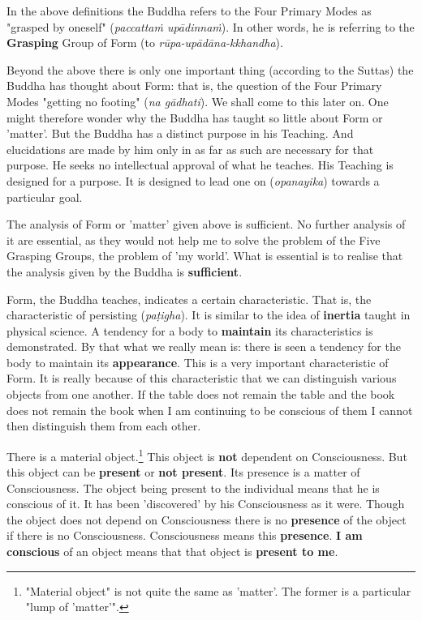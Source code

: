 In the above definitions the Buddha refers to the Four Primary Modes as
"grasped by oneself" (\emph{paccattaṁ upādinnaṁ}). In other words, he is
referring to the \textbf{Grasping} Group of Form (to \emph{rūpa-upādāna-kkhandha}).


Beyond the above there is only one important thing (according to
the Suttas) the Buddha has thought about Form: that is, the question of
the Four Primary Modes "getting no footing" (\emph{na gādhati}). We shall
come to this later on. One might therefore wonder why the Buddha has
taught so little about Form or 'matter'. But the Buddha has a distinct
purpose in his Teaching. And elucidations are made by him only in as far
as such are necessary for that purpose. He seeks no intellectual
approval of what he teaches. His Teaching is designed for a purpose. It
is designed to lead one on (\emph{opanayika}) towards a particular goal.


The analysis of Form or 'matter' given above is sufficient. No further
analysis of it are essential, as they would not help me to solve the
problem of the Five Grasping Groups, the problem of 'my world'. What is
essential is to realise that the analysis given by the Buddha is
\textbf{sufficient}.


Form, the Buddha teaches, indicates a certain characteristic. That is,
the characteristic of persisting (\emph{paṭigha}). It is similar to the
idea of \textbf{inertia} taught in physical science. A tendency for a body to
\textbf{maintain} its characteristics is demonstrated. By that what we really
mean is: there is seen a tendency for the body to maintain its
\textbf{appearance}. This is a very important characteristic of Form. It is
really because of this characteristic that we can distinguish various
objects from one another. If the table does not remain the table and the
book does not remain the book when I am continuing to be conscious of
them I cannot then distinguish them from each other.


There is a material object.\footnote{"Material object" is not quite the same as 'matter'. The former is a particular "lump of 'matter'".} This
object is \textbf{not} dependent on Consciousness. But this object can be
\textbf{present} or \textbf{not present}. Its presence is a matter of Consciousness.
The object being present to the individual means that he is conscious of
it. It has been 'discovered' by his Consciousness as it were. Though the
object does not depend on Consciousness there is no \textbf{presence} of the
object if there is no Consciousness. Consciousness means this
\textbf{presence}. \textbf{I am conscious} of an object means that that object is
\textbf{present to me}.


